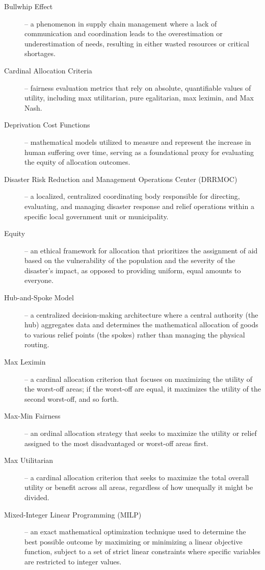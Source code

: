 \begin{description}
\item[Bullwhip Effect] – a phenomenon in supply chain management where a lack of communication and coordination leads to the overestimation or underestimation of needs, resulting in either wasted resources or critical shortages.
\item[Cardinal Allocation Criteria] – fairness evaluation metrics that rely on absolute, quantifiable values of utility, including max utilitarian, pure egalitarian, max leximin, and Max Nash.
\item[Deprivation Cost Functions] – mathematical models utilized to measure and represent the increase in human suffering over time, serving as a foundational proxy for evaluating the equity of allocation outcomes.
\item[Disaster Risk Reduction and Management Operations Center (DRRMOC)] – a localized, centralized coordinating body responsible for directing, evaluating, and managing disaster response and relief operations within a specific local government unit or municipality.
\item[Equity] – an ethical framework for allocation that prioritizes the assignment of aid based on the vulnerability of the population and the severity of the disaster's impact, as opposed to providing uniform, equal amounts to everyone.
\item[Hub-and-Spoke Model] – a centralized decision-making architecture where a central authority (the hub) aggregates data and determines the mathematical allocation of goods to various relief points (the spokes) rather than managing the physical routing.
\item[Max Leximin] – a cardinal allocation criterion that focuses on maximizing the utility of the worst-off areas; if the worst-off are equal, it maximizes the utility of the second worst-off, and so forth.
\item[Max-Min Fairness] – an ordinal allocation strategy that seeks to maximize the utility or relief assigned to the most disadvantaged or worst-off areas first.
\item[Max Utilitarian] – a cardinal allocation criterion that seeks to maximize the total overall utility or benefit across all areas, regardless of how unequally it might be divided.
\item[Mixed-Integer Linear Programming (MILP)] – an exact mathematical optimization technique used to determine the best possible outcome by maximizing or minimizing a linear objective function, subject to a set of strict linear constraints where specific variables are restricted to integer values.

\end{description}

